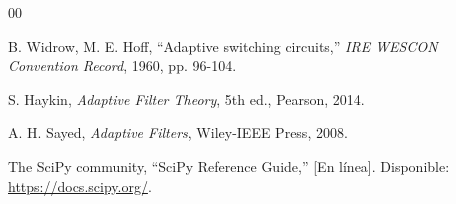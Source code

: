 \begin{thebibliography}{00}

 B. Widrow, M. E. Hoff, ``Adaptive switching
circuits,'' \textit{IRE WESCON Convention Record}, 1960, pp. 96-104.

 S. Haykin, \textit{Adaptive Filter Theory}, 5th ed.,
Pearson, 2014.

 A. H. Sayed, \textit{Adaptive Filters}, Wiley-IEEE
Press, 2008.

 The SciPy community, ``SciPy Reference Guide,'' [En
línea]. Disponible: \url{https://docs.scipy.org/}.

\end{thebibliography}

